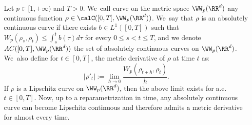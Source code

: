 Let $p \in [1,+\infty)$ and $T > 0$. We~call curve on the metric space $\WW_p(\RR^d)$ any continuous function $\rho \in \calC([0,T], \WW_p(\RR^d))$. We~say that $\rho$ is an absolutely continuous curve if there exists $b \in L^1([0,T])$ such that $W_p(\rho_s, \rho_t) \leq \int_s^t b(\tau)d\tau$ for every $0\leq s<t\leq T$, and we denote $AC([0,T], \WW_p(\RR^d))$ the set of absolutely continuous curves on $\WW_p(\RR^d)$. We~also define for $t \in [0,T]$, the metric derivative of $\rho$ at time $t$ as:
\begin{equation*}
|\rho'_t| := \lim_{h \to 0} \frac{W_p(\rho_{t+h},\rho_t)}{h}.
\end{equation*}
If $\rho$ is a Lipschitz curve on $\WW_p(\RR^d)$, then the above limit exists for a.e. $t \in [0,T]$. Now, up to a reparametrization in time, any absolutely continuous curve can become Lipschitz continuous and therefore admits a metric derivative for almost every time.

